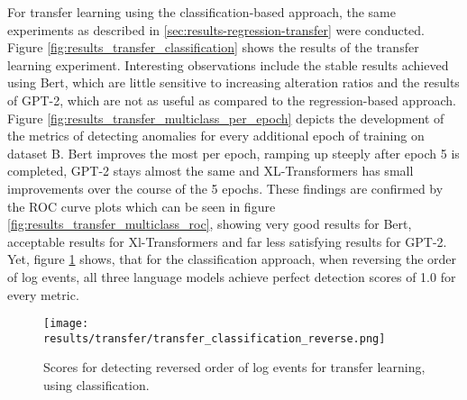 For transfer learning using the classification-based approach, the same experiments as described in \ref{sec:results-regression-transfer} were conducted. Figure \ref{fig:results_transfer_classification} shows the results of the transfer learning experiment. Interesting observations include the stable results achieved using Bert, which are little sensitive to increasing alteration ratios and the results of GPT-2, which are not as useful as compared to the regression-based approach.
Figure \ref{fig:results_transfer_multiclass_per_epoch} depicts the development of the metrics of detecting anomalies for every additional epoch of training on dataset B. Bert improves the most per epoch, ramping up steeply after epoch 5 is completed, GPT-2 stays almost the same and XL-Transformers has small improvements over the course of the 5 epochs. These findings are confirmed by the ROC curve plots which can be seen in figure \ref{fig:results_transfer_multiclass_roc}, showing very good results for Bert, acceptable results for Xl-Transformers and far less satisfying results for GPT-2. Yet, figure \ref{fig:classification_transfer_reverse} shows, that for the classification approach, when reversing the order of log events, all three language models achieve perfect detection scores of 1.0 for every metric.


\begin{figure}[h]
  \centering
  \texttt{[image: results/transfer/transfer\_classification\_reverse.png]}\\
  \caption{Scores for detecting reversed order of log events for transfer learning, using classification.}
  \label{fig:classification_transfer_reverse}
  
\end{figure}
\begin{figure*}[ht!]
\hspace{\fill}
\hspace{\fill}
   \\
\caption{\label{fig:results_transfer_classification}Transfer learning with different ratios of alteration, using classification.}
\end{figure*}


